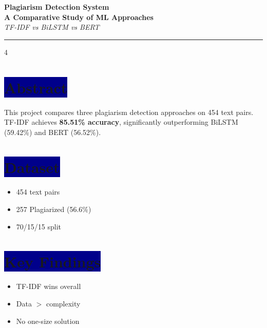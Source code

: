 \documentclass[11pt]{article}
\newcommand{\sectiontitle}[1]{\colorbox{darkblue}{\color{white}\normalsize\textbf{#1}}}
\begin{document}
\begin{center}
{\Large\textbf{\color{darkblue}Plagiarism Detection System}}\\
{\small\textbf{A Comparative Study of ML Approaches}}\\
{\tiny\textit{TF-IDF vs BiLSTM vs BERT}}\\
\rule{\textwidth}{2pt}
\end{center}

\begin{multicols}{4}

\section*{\sectiontitle{Abstract}}

{\small This project compares three plagiarism detection approaches on 454 text pairs. TF-IDF achieves \textbf{85.51\% accuracy}, significantly outperforming BiLSTM (59.42\%) and BERT (56.52\%).}

\vspace{0.15cm}

\vspace{0.15cm}
\section*{\sectiontitle{Dataset}}

{\tiny
\begin{itemize}
\item 454 text pairs
\item 257 Plagiarized (56.6\%)
\item 70/15/15 split
\end{itemize}
}

\vspace{0.1cm}
\section*{\sectiontitle{Key Findings}}

{\tiny
\begin{itemize}
\item TF-IDF wins overall
\item Data $>$ complexity
\item No one-size solution
\end{itemize}
}


\end{multicols}
\end{document}
